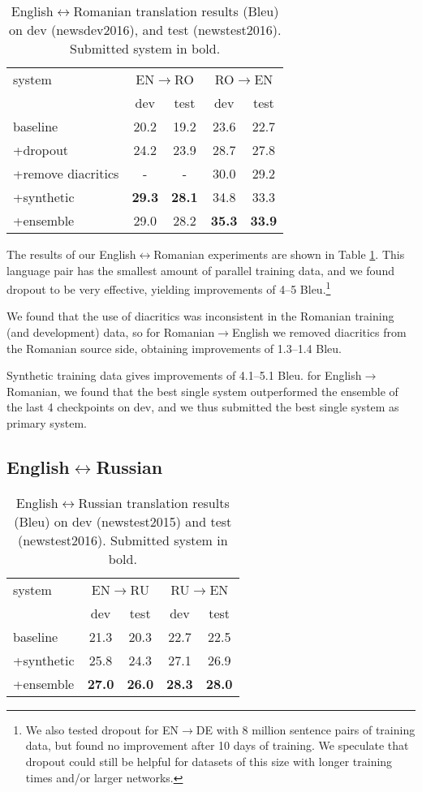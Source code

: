 \documentclass[11pt]{article}
\begin{document}
\begin{table}[t]
\centering
\begin{tabular}{l|cc|cc}
system & \multicolumn{2}{c|}{EN$\to$RO} & \multicolumn{2}{c}{RO$\to$EN}\\
& dev & test & dev & test\\
\hline
baseline & 20.2 & 19.2 &23.6 & 22.7\\ +dropout & 24.2 & 23.9 & 28.7 & 27.8\\ +remove diacritics & - & - & 30.0 & 29.2\\ +synthetic & \textbf{29.3} & \textbf{28.1} & 34.8 & 33.3\\ +ensemble & 29.0 & 28.2 & \textbf{35.3} & \textbf{33.9}\\ \end{tabular}
\caption{English$\leftrightarrow$Romanian translation results ({\sc Bleu}) on dev (newsdev2016), and test (newstest2016). Submitted system in bold.}
\label{results-ro}
\end{table}

The results of our English$\leftrightarrow$Romanian experiments are shown in Table \ref{results-ro}.
This language pair has the smallest amount of parallel training data, and we found dropout to be very effective, yielding improvements of 4--5 {\sc Bleu}.\footnote{We also tested dropout for EN$\to$DE with 8 million sentence pairs of training data, but found no improvement after 10 days of training. We speculate that dropout could still be helpful for datasets of this size with longer training times and/or larger networks.}

We found that the use of diacritics was inconsistent in the Romanian training (and development) data,  so
for Romanian$\to$English we removed diacritics from the Romanian source side, obtaining improvements of 1.3--1.4 {\sc Bleu}.

Synthetic training data gives improvements of 4.1--5.1 {\sc Bleu}.
for English$\to$Romanian, we found that the best single system outperformed the ensemble of the last 4 checkpoints on dev, and we thus submitted the best single system as primary system.

\subsection{English$\leftrightarrow$Russian}

\begin{table}
\centering
\begin{tabular}{l|cc|cc}
system & \multicolumn{2}{c|}{EN$\to$RU} & \multicolumn{2}{c}{RU$\to$EN}\\
& dev & test & dev & test\\
\hline
baseline & 21.3 & 20.3 &22.7 & 22.5 \\ +synthetic & 25.8& 24.3 &27.1 & 26.9\\ +ensemble & \textbf{27.0} & \textbf{26.0} &\textbf{28.3} & \textbf{28.0}\\ \end{tabular}
\caption{English$\leftrightarrow$Russian translation results ({\sc Bleu}) on dev (newstest2015) and test (newstest2016). Submitted system in bold.}
\label{results-ru}
\end{table}
\end{document}
